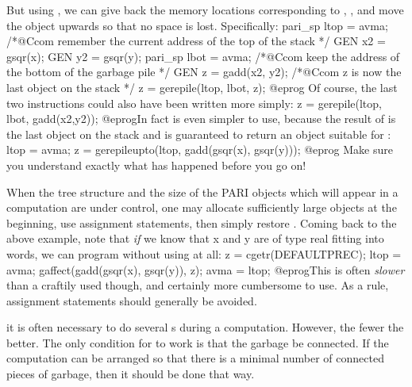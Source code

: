 But using , we can give back the memory locations corresponding
to , , and move the object  upwards so that no
space is lost. Specifically:
\bprog
  pari_sp ltop = avma;  /*@Ccom remember the current address of the top of the stack */
  GEN x2 = gsqr(x);
  GEN y2 = gsqr(y);
  pari_sp lbot = avma;  /*@Ccom keep the address of the bottom of the garbage pile */
  GEN z = gadd(x2, y2); /*@Ccom z is now the last object on the stack */
  z = gerepile(ltop, lbot, z);
@eprog
\noindent Of course, the last two instructions could also have been
written more simply:
\bprog
  z = gerepile(ltop, lbot, gadd(x2,y2));
@eprog\noindent In fact  is even simpler to use, because
the result of  is the last object on the stack and 
is guaranteed to return an object suitable for :
\bprog
  ltop = avma;
  z = gerepileupto(ltop, gadd(gsqr(x), gsqr(y)));
@eprog\noindent
Make sure you understand exactly what has happened before you go on!

 When the tree structure and
the size of the PARI objects which will appear in a computation are under
control, one may allocate sufficiently large objects at the beginning,
use assignment statements, then simply restore . Coming back to the
above example, note that \emph{if} we know that x and y are of type real
fitting into  words, we can program without using
 at all:
\bprog
  z = cgetr(DEFAULTPREC); ltop = avma;
  gaffect(gadd(gsqr(x), gsqr(y)), z);
  avma = ltop;
@eprog\noindent This is often \emph{slower} than a craftily used
 though, and certainly more cumbersome to use. As a rule,
assignment statements should generally be avoided.

 it is often necessary to do several
s during a computation. However, the fewer the better. The only
condition for  to work is that the garbage be connected. If the
computation can be arranged so that there is a minimal number of connected
pieces of garbage, then it should be done that way.

